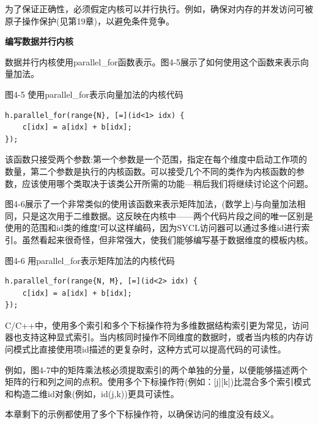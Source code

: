 为了保证正确性，必须假定内核可以并行执行。例如，确保对内存的并发访问可被原子操作保护(见第19章)，以避免条件竞争。\par

\hspace*{\fill} \par %
\textbf{编写数据并行内核}

数据并行内核使用parallel\_for函数表示。图4-5展示了如何使用这个函数来表示向量加法。\par

\hspace*{\fill} \par %
图4-5 使用parallel\_for表示向量加法的内核代码
\begin{lstlisting}[caption={}]
h.parallel_for(range{N}, [=](id<1> idx) {
	c[idx] = a[idx] + b[idx];
});
\end{lstlisting}

该函数只接受两个参数:第一个参数是一个范围，指定在每个维度中启动工作项的数量，第二个参数是执行的内核函数。可以接受几个不同的类作为内核函数的参数，应该使用哪个类取决于该类公开所需的功能—稍后我们将继续讨论这个问题。\par

图4-6展示了一个非常类似的使用该函数来表示矩阵加法，(数学上)与向量加法相同，只是这次用于二维数据。这反映在内核中——两个代码片段之间的唯一区别是使用的范围和id类的维度!可以这样编码，因为SYCL访问器可以通过多维id进行索引。虽然看起来很奇怪，但非常强大，使我们能够编写基于数据维度的模板内核。\par

\hspace*{\fill} \par %
图4-6 用parallel\_for表示矩阵加法的内核代码
\begin{lstlisting}[caption={}]
h.parallel_for(range{N, M}, [=](id<2> idx) {
	c[idx] = a[idx] + b[idx];
});
\end{lstlisting}

C/C++中，使用多个索引和多个下标操作符为多维数据结构索引更为常见，访问器也支持这种显式索引。当内核同时操作不同维度的数据时，或者当内核的内存访问模式比直接使用项id描述的更复杂时，这种方式可以提高代码的可读性。\par

例如，图4-7中的矩阵乘法核必须提取索引的两个单独的分量，以便能够描述两个矩阵的行和列之间的点积。使用多个下标操作符(例如：[j][k])比混合多个索引模式和构造二维id对象(例如，id(j,k))更具可读性。\par

本章剩下的示例都使用了多个下标操作符，以确保访问的维度没有歧义。\par

